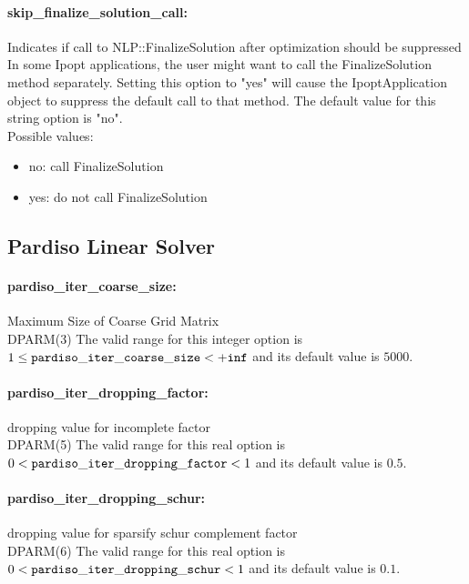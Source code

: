 \paragraph{skip\_finalize\_solution\_call:}\label{opt:skip_finalize_solution_call} Indicates if call to NLP::FinalizeSolution after optimization should be suppressed \\
 In some Ipopt applications, the user might want to call the FinalizeSolution method separately.  Setting this option to "yes" will cause the IpoptApplication object to suppress the default call to that method. The default value for this string option is "no".
\\ 
Possible values:
\begin{itemize}
   \item no: call FinalizeSolution
   \item yes: do not call FinalizeSolution
\end{itemize}

\subsection{Pardiso Linear Solver}
\label{sec:PardisoLinearSolver}
\paragraph{pardiso\_iter\_coarse\_size:}\label{opt:pardiso_iter_coarse_size} Maximum Size of Coarse Grid Matrix \\
 DPARM(3) The valid range for this integer option is
$1 \le {\tt pardiso\_iter\_coarse\_size } <  {\tt +inf}$
and its default value is $5000$.


\paragraph{pardiso\_iter\_dropping\_factor:}\label{opt:pardiso_iter_dropping_factor} dropping value for incomplete factor \\
 DPARM(5) The valid range for this real option is 
$0 <  {\tt pardiso\_iter\_dropping\_factor } <  1$
and its default value is $0.5$.


\paragraph{pardiso\_iter\_dropping\_schur:}\label{opt:pardiso_iter_dropping_schur} dropping value for sparsify schur complement factor \\
 DPARM(6) The valid range for this real option is 
$0 <  {\tt pardiso\_iter\_dropping\_schur } <  1$
and its default value is $0.1$.


